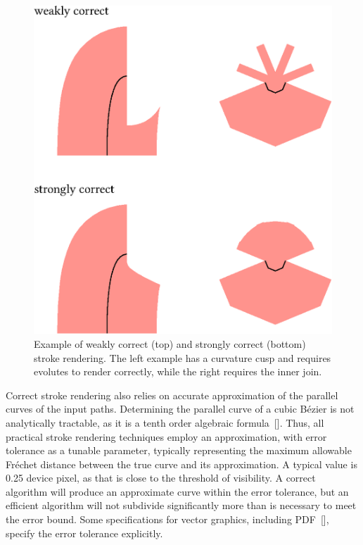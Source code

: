 \documentclass[sigconf, nonacm]{acmart}
\begin{document}
\begin{figure}
    \includegraphics[scale=0.5]{weak_strong}
    \caption{Example of weakly correct (top) and strongly correct (bottom) stroke rendering. The left example has a curvature cusp and requires evolutes to render correctly, while the right requires the inner join.}
    \label{fig:weak_strong}
\end{figure}

Correct stroke rendering also relies on accurate approximation of the parallel curves of the input paths. Determining the parallel curve of a cubic Bézier is not analytically tractable, as it is a tenth order algebraic formula~[]. Thus, all practical stroke rendering techniques employ an approximation, with error tolerance as a tunable parameter, typically representing the maximum allowable Fréchet distance between the true curve and its approximation. A typical value is 0.25 device pixel, as that is close to the threshold of visibility. A correct algorithm will produce an approximate curve within the error tolerance, but an efficient algorithm will not subdivide significantly more than is necessary to meet the error bound. Some specifications for vector graphics, including PDF~[], specify the error tolerance explicitly.
\end{document}
